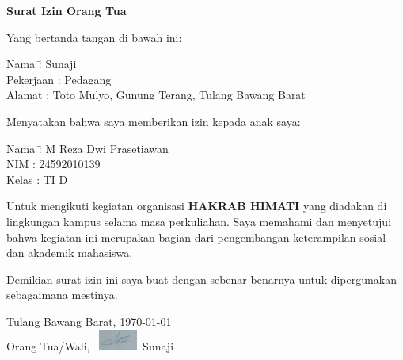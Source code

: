 \documentclass[a4paper,12pt]{article}
\begin{document}
\begin{center}
    \Large\textbf{Surat Izin Orang Tua}
\end{center}

\vspace{0.5cm}

\noindent
Yang bertanda tangan di bawah ini:

\vspace{0.2cm}

\begin{tabbing}
    Nama \hspace{2.2cm} \= : Sunaji \\
    Pekerjaan \> : Pedagang \\
    Alamat \> : Toto Mulyo, Gunung  Terang, Tulang Bawang Barat
\end{tabbing}

\vspace{0.5cm}

\noindent
Menyatakan bahwa saya memberikan izin kepada anak saya:

\vspace{0.2cm}

\begin{tabbing}
    Nama \hspace{2.2cm} \= : M Reza Dwi Prasetiawan\\
    NIM \> : 24592010139 \\
    Kelas \> : TI D
\end{tabbing}

\vspace{0.5cm}

\noindent
Untuk mengikuti kegiatan organisasi \textbf{HAKRAB HIMATI} yang diadakan di lingkungan kampus selama masa perkuliahan. Saya memahami dan menyetujui bahwa kegiatan ini merupakan bagian dari pengembangan keterampilan sosial dan akademik mahasiswa.

\vspace{0.5cm}

\noindent
Demikian surat izin ini saya buat dengan sebenar-benarnya untuk dipergunakan sebagaimana mestinya.

\vspace{1cm}

\begin{flushright}
    Tulang Bawang Barat, \today\\
    Orang Tua/Wali, \
    \includegraphics[width=0.5in]{resources/parent_sign.jpg}\
    Sunaji
\end{flushright}
\end{document}
